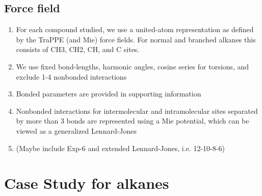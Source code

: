 \documentclass[preprint,letterpaper,floatfix,citeautoscript,aip,jcp]{revtex4-1}
\begin{document}
\subsection{Force field}

\begin{enumerate}
	\item For each compound studied, we use a united-atom representation as defined by the TraPPE (and Mie) force fields. For normal and branched alkanes this consists of CH3, CH2, CH, and C sites.
	\item We use fixed bond-lengths, harmonic angles, cosine series for torsions, and exclude 1-4 nonbonded interactions 
	\item Bonded parameters are provided in supporting information
	\item Nonbonded interactions for intermolecular and intramolecular sites separated by more than 3 bonds are represented using a Mie potential, which can be viewed as a generalized Lennard-Jones
	\item (Maybe include Exp-6 and extended Lennard-Jones, i.e. 12-10-8-6)
\end{enumerate}

\section{Case Study for alkanes}
\end{document}
